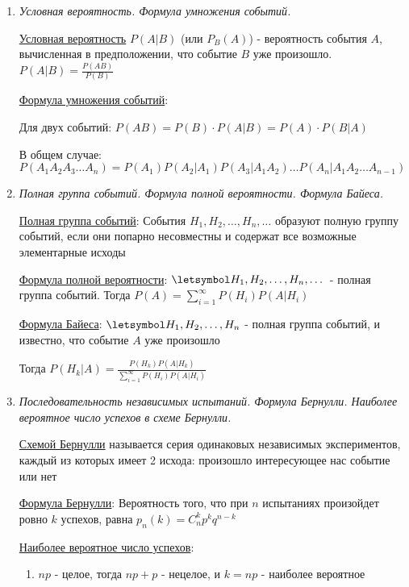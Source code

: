 \begin{enumerate}
    \item \textit{Условная вероятность. Формула умножения событий.}

    \hyperlink{conditionalprobability}{Условная вероятность} $P(A|B)$ (или $P_B(A)$) - вероятность события $A$, вычисленная в предположении, что событие $B$ уже произошло. $P(A|B) = \frac{P(AB)}{P(B)}$

    \hyperlink{eventsmultiplicationformula}{Формула умножения событий}:

    Для двух событий: $P(AB) = P(B) \cdot P(A|B) = P(A) \cdot P(B|A)$

    В общем случае: $P(A_1 A_2 A_3 \dots A_n) = P(A_1) P(A_2 | A_1) P(A_3 | A_1 A_2) \dots P(A_n | A_1 A_2 \dots A_{n - 1})$

    \item \textit{Полная группа событий. Формула полной вероятности. Формула Байеса.}

    \hyperlink{completegroupofevents}{Полная группа событий}: События $H_1, H_2, \dots, H_n, \dots$ образуют полную группу событий, если они попарно несовместны и содержат все возможные элементарные исходы

    \hyperlink{formulaofcompleteprobability}{Формула полной вероятности}: $\letsymbol H_1, H_2, \dots, H_n, \dots$ - полная группа событий. Тогда $P(A) = \sum_{i = 1}^\infty P(H_i) P(A | H_i)$
    
    \hyperlink{bayesformula}{Формула Байеса}: $\letsymbol H_1, H_2, \dots, H_n$ - полная группа событий, и известно, что событие $A$ уже произошло

    Тогда $P(H_k | A) = \frac{P(H_k) P(A | H_k)}{\sum_{i = 1}^\infty P(H_i) P(A | H_i)}$

    \item \textit{Последовательность независимых испытаний. Формула Бернулли. Наиболее вероятное число успехов в схеме Бернулли.}

    \hyperlink{bernoullischema}{Схемой Бернулли} называется серия одинаковых независимых экспериментов, каждый из которых имеет 2 исхода: произошло интересующее нас событие или нет

    \hyperlink{bernoulliformula}{Формула Бернулли}: Вероятность того, что при $n$ испытаниях произойдет ровно $k$ успехов, равна
    $p_n(k) = C_n^k p^k q^{n - k}$

    \hyperlink{themostprobablenumberofsuccesses}{Наиболее вероятное число успехов}: 

    \begin{enumerate}
        \item $np$ - целое, тогда $np + p$ - нецелое, и $k = np$ - наиболее вероятное


\end{enumerate}
\end{enumerate}
